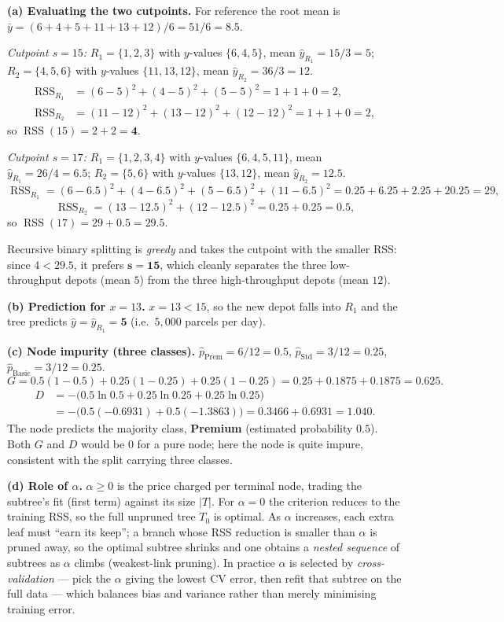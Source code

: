 \documentclass[11pt,a4paper]{article}
\begin{document}
\ifdefined\withsolutions
\begin{solutionbox}
\textbf{(a) Evaluating the two cutpoints.}
For reference the root mean is $\bar{y}=(6+4+5+11+13+12)/6=51/6=8.5$.

\emph{Cutpoint $s=15$:} $R_1=\{1,2,3\}$ with $y$-values $\{6,4,5\}$, mean $\hat{y}_{R_1}=15/3=5$;
$R_2=\{4,5,6\}$ with $y$-values $\{11,13,12\}$, mean $\hat{y}_{R_2}=36/3=12$.
\[
  \begin{aligned}
  \operatorname{RSS}_{R_1}&=(6-5)^2+(4-5)^2+(5-5)^2=1+1+0=2,\\
  \operatorname{RSS}_{R_2}&=(11-12)^2+(13-12)^2+(12-12)^2=1+1+0=2,
  \end{aligned}
\]
so $\operatorname{RSS}(15)=2+2=\mathbf{4}$.

\emph{Cutpoint $s=17$:} $R_1=\{1,2,3,4\}$ with $y$-values $\{6,4,5,11\}$, mean
$\hat{y}_{R_1}=26/4=6.5$; $R_2=\{5,6\}$ with $y$-values $\{13,12\}$, mean $\hat{y}_{R_2}=12.5$.
\[
  \operatorname{RSS}_{R_1}=(6-6.5)^2+(4-6.5)^2+(5-6.5)^2+(11-6.5)^2=0.25+6.25+2.25+20.25=29,
\]
\[
  \operatorname{RSS}_{R_2}=(13-12.5)^2+(12-12.5)^2=0.25+0.25=0.5,
\]
so $\operatorname{RSS}(17)=29+0.5=\mathbf{29.5}$.

Recursive binary splitting is \emph{greedy} and takes the cutpoint with the smaller RSS: since
$4<29.5$, it prefers $\mathbf{s=15}$, which cleanly separates the three low-throughput depots
(mean $5$) from the three high-throughput depots (mean $12$).

\medskip
\textbf{(b) Prediction for $x=13$.}
$x=13<15$, so the new depot falls into $R_1$ and the tree predicts
$\hat{y}=\hat{y}_{R_1}=\mathbf{5}$ (i.e.\ $5{,}000$ parcels per day).

\medskip
\textbf{(c) Node impurity (three classes).}
$\hat{p}_{\text{Prem}}=6/12=0.5$, $\hat{p}_{\text{Std}}=3/12=0.25$,
$\hat{p}_{\text{Basic}}=3/12=0.25$.
\[
  G=0.5(1-0.5)+0.25(1-0.25)+0.25(1-0.25)=0.25+0.1875+0.1875=\mathbf{0.625}.
\]
\[
  \begin{aligned}
  D&=-\bigl(0.5\ln 0.5+0.25\ln 0.25+0.25\ln 0.25\bigr)\\
   &=-\bigl(0.5(-0.6931)+0.5(-1.3863)\bigr)=0.3466+0.6931=\mathbf{1.040}.
  \end{aligned}
\]
The node predicts the majority class, \textbf{Premium} (estimated probability $0.5$). Both $G$
and $D$ would be $0$ for a pure node; here the node is quite impure, consistent with the split
carrying three classes.

\medskip
\textbf{(d) Role of $\alpha$.}
$\alpha\ge 0$ is the price charged per terminal node, trading the subtree's fit (first term)
against its size $|T|$.
For $\alpha=0$ the criterion reduces to the training RSS, so the full unpruned tree $T_0$ is
optimal. As $\alpha$ increases, each extra leaf must ``earn its keep''; a branch whose RSS
reduction is smaller than $\alpha$ is pruned away, so the optimal subtree shrinks and one
obtains a \emph{nested sequence} of subtrees as $\alpha$ climbs (weakest-link pruning). In
practice $\alpha$ is selected by \emph{cross-validation} --- pick the $\alpha$ giving the lowest
CV error, then refit that subtree on the full data --- which balances bias and variance rather
than merely minimising training error.
\end{solutionbox}
\fi
\end{document}
